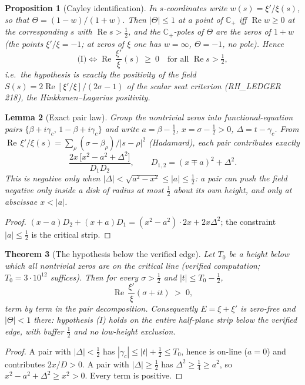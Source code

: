 \documentclass[11pt]{article}
\newtheorem{theorem}{Theorem}
\newtheorem{lemma}[theorem]{Lemma}
\newtheorem{proposition}[theorem]{Proposition}
\newcommand{\C}{\mathbb{C}}
\newcommand{\Hp}{\C_{+}}
\newcommand{\Th}{\Theta}
\begin{document}
\begin{proposition}[Cayley identification]\label{prop:cayley}
In $s$-coordinates write $w(s)=\xi'/\xi(s)$, so that
$\Th=(1-w)/(1+w)$. Then $|\Th|\le1$ at a point of $\Hp$ iff
$\operatorname{Re}w\ge0$ at the corresponding $s$ with
$\operatorname{Re}s>\tfrac12$, and the $\Hp$-poles of $\Th$ are the zeros of
$1+w$ (the points $\xi'/\xi=-1$; at zeros of $\xi$ one has $w=\infty$,
$\Th=-1$, no pole). Hence
\[ \text{(I)}\iff \operatorname{Re}\,\frac{\xi'}{\xi}(s)\ \ge\ 0
\quad\text{for all }\operatorname{Re}s>\tfrac12 , \]
i.e.\ the hypothesis is exactly the positivity of the field
$S(s)=2\operatorname{Re}[\xi'/\xi]/(2\sigma-1)$ of the scalar seat criterion
(RH\_LEDGER 218), the Hinkkanen--Lagarias positivity.
\end{proposition}

\begin{lemma}[Exact pair law]\label{lem:pair}
Group the nontrivial zeros into functional-equation pairs
$\{\beta+i\gamma_c,\,1-\beta+i\gamma_c\}$ and write $a=\beta-\tfrac12$,
$x=\sigma-\tfrac12>0$, $\Delta=t-\gamma_c$. From
$\operatorname{Re}\,\xi'/\xi(s)=\sum_\rho(\sigma-\beta_\rho)/|s-\rho|^2$
(Hadamard), each pair contributes exactly
\[ \frac{2x\,\big[x^{2}-a^{2}+\Delta^{2}\big]}{D_1D_2},\qquad
D_{1,2}=(x\mp a)^2+\Delta^2 . \]
This is negative only when $|\Delta|<\sqrt{a^{2}-x^{2}}\le|a|\le\tfrac12$:
a pair can push the field negative only inside a disk of radius at most
$\tfrac12$ about its own height, and only at abscissae $x<|a|$.
\end{lemma}

\begin{proof}
$(x-a)D_2+(x+a)D_1=(x^2-a^2)\cdot 2x+2x\Delta^2$; the constraint $|a|\le\frac12$
is the critical strip.
\end{proof}

\begin{theorem}[The hypothesis below the verified edge]\label{thm:belowedge}
Let $T_0$ be a height below which all nontrivial zeros are on the critical
line (verified computation; $T_0=3\cdot10^{12}$ suffices). Then for every
$\sigma>\tfrac12$ and $|t|\le T_0-\tfrac12$,
\[ \operatorname{Re}\,\frac{\xi'}{\xi}(\sigma+it)\;>\;0 , \]
term by term in the pair decomposition. Consequently $E=\xi+\xi'$ is zero-free
and $|\Th|<1$ there: hypothesis (I) holds on the entire half-plane strip below
the verified edge, with buffer $\tfrac12$ and no low-height exclusion.
\end{theorem}

\begin{proof}
A pair with $|\Delta|<\tfrac12$ has $|\gamma_c|\le|t|+\tfrac12\le T_0$, hence
is on-line ($a=0$) and contributes $2x/D>0$. A pair with
$|\Delta|\ge\tfrac12$ has $\Delta^2\ge\tfrac14\ge a^2$, so
$x^2-a^2+\Delta^2\ge x^2>0$. Every term is positive.
\end{proof}
\end{document}
